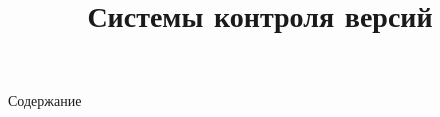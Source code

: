 \documentclass{beamer}
\title{Системы контроля версий}
\date{}
\begin{document}
\begin{frame}
	\maketitle
\end{frame}

\begin{frame}[allowframebreaks]{Содержание}
	\tableofcontents
\end{frame}
\end{document}
